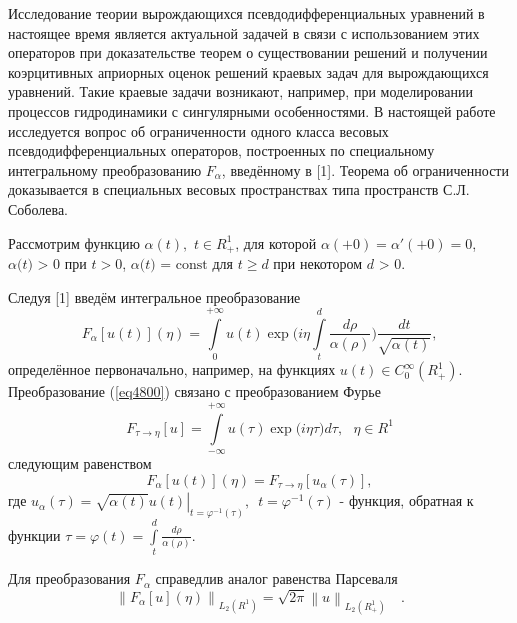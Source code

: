 



\vzmscaption


Исследование теории вырождающихся псевдодифференциальных уравнений в
настоящее время является актуальной задачей в связи с использованием этих
операторов при доказательстве теорем о существовании решений и получении
коэрцитивных априорных оценок решений краевых задач для вырождающихся
уравнений. Такие краевые задачи возникают, например, при моделировании
процессов гидродинамики с сингулярными особенностями. В настоящей работе
исследуется вопрос об ограниченности одного класса весовых
псевдодифференциальных операторов, построенных по специальному интегральному
преобразованию $F_\alpha $, введённому в [1]. Теорема об ограниченности
доказывается в специальных весовых пространствах типа пространств С.Л.
Соболева.

Рассмотрим функцию $\alpha (t),\,\,t \in R_ + ^1 $, для которой $\alpha ( +
0) = {\alpha }'( + 0) = 0$, $\alpha \mbox{(}t\mbox{) > 0}$ при $t > 0$,
$\alpha \mbox{(}t\mbox{) = const}$ для $t \geqslant d$ при некотором $d\mbox{ >
0}$.

Следуя [1] введём интегральное преобразование
\begin{equation}
\label{eq4800}
F_\alpha [u(t)](\eta ) = \int\limits_0^{ + \infty } {u(t)\exp (i\eta }
\int\limits_t^d {\frac{d\rho }{\alpha (\rho )}} )\frac{dt}{\sqrt {\alpha
(t)} },
\end{equation}
определённое первоначально, например, на функциях $u(t) \in C_0^\infty (R_ +
^1 )$. Преобразование (\ref{eq4800}) связано с преобразованием Фурье
\[
F_{\tau \to \eta } [u] = \int\limits_{ - \infty }^{ + \infty } {u(\tau )\exp
(i\eta } \tau )d\tau ,\,\,\,\,\eta \in R^1
\]
следующим равенством
\[
F_\alpha [u(t)](\eta ) = F_{\tau \to \eta } [u_\alpha (\tau )],
\]
где $u_\alpha (\tau ) = \left. {\sqrt {\alpha (t)} u(t)} \right|_{t =
\varphi ^{ - 1}(\tau )} ,\,\,\,t = \varphi ^{ - 1}(\tau )$ - функция,
обратная к функции $\tau = \varphi (t) = \int\limits_t^d {\frac{d\rho
}{\alpha (\rho )}} .$

Для преобразования $F_\alpha $ справедлив аналог равенства Парсеваля
\[
\left\| {F_\alpha [u](\eta )} \right\|_{L_2 (R^1)} = \sqrt {2\pi } \left\| u
\right\|_{L_2 (R_ + ^1 )} \quad .
\]



